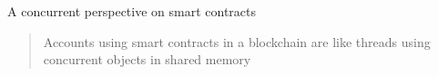 
\begin{frame}{A concurrent perspective on smart contracts~\cite{}}

\begin{quote}
Accounts using smart contracts in a blockchain are like threads using concurrent
objects in shared memory
\end{quote}


\end{frame}

